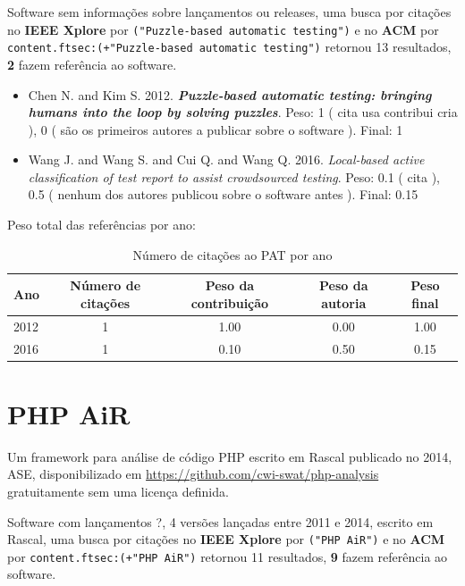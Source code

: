 Software sem informações sobre lançamentos ou releases,
uma busca por citações no {\bf IEEE Xplore} por
\texttt{("Puzzle-based automatic testing")}
e no {\bf ACM} por
\texttt{content.ftsec:(+"Puzzle-based automatic testing")}
retornou
13 resultados,
{\bf 2} fazem referência ao software.

\begin{itemize}
\item Chen N. and Kim S.
      2012.
        \textbf{\textit{ Puzzle-based automatic testing: bringing humans into the loop by solving puzzles}}.
      Peso:
      1 (
          cita
          usa
          contribui
          cria
      ),
      0 (
são os primeiros autores a publicar sobre o software
      ).
      Final:
      1

\item Wang J. and Wang S. and Cui Q. and Wang Q.
      2016.
        \textit{ Local-based active classification of test report to assist crowdsourced testing}.
      Peso:
      0.1 (
          cita
      ),
      0.5 (
nenhum dos autores publicou sobre o software antes
      ).
      Final:
      0.15

\end{itemize}

Peso total das referências por ano:

\begin{table}[h]
\caption{Número de citações ao PAT  por ano}
\centering
\begin{tabular}{| l | c | c | c | c |}
  \hline
  Ano & Número de citações & Peso da contribuição & Peso da autoria & Peso final \\
  \hline
  2012
    & 1
    & 1.00
    & 0.00
    & 1.00 \\
  2016
    & 1
    & 0.10
    & 0.50
    & 0.15 \\
  \hline
\end{tabular}
\end{table}


\section{PHP AiR}

Um framework para análise de código PHP escrito em Rascal
publicado no 2014, ASE,
disponibilizado em \url{https://github.com/cwi-swat/php-analysis}
gratuitamente
sem uma licença definida.

Software com lançamentos ?,
4 versões lançadas
entre 2011 e 2014,
escrito em Rascal,
uma busca por citações no {\bf IEEE Xplore} por
\texttt{("PHP AiR")}
e no {\bf ACM} por
\texttt{content.ftsec:(+"PHP AiR")}
retornou
11 resultados,
{\bf 9} fazem referência ao software.

